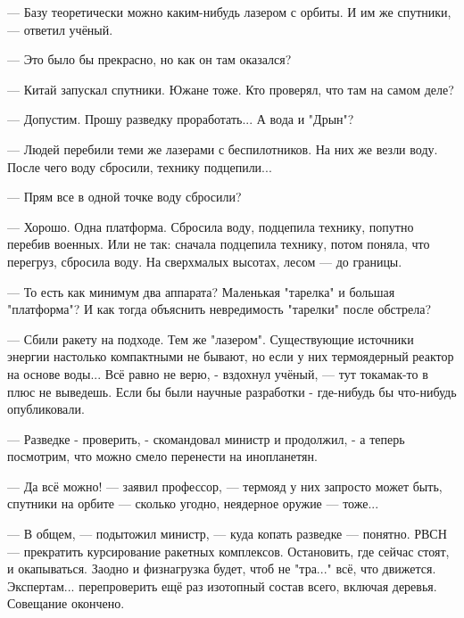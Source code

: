 --- Базу теоретически можно каким-нибудь лазером с орбиты. И им же спутники, --- ответил учёный.

--- Это было бы прекрасно, но как он там оказался?

--- Китай запускал спутники. Южане тоже. Кто проверял, что там на самом деле?

--- Допустим. Прошу разведку проработать... А вода и "Дрын"?

--- Людей перебили теми же лазерами с беспилотников. На них же везли воду. После чего воду сбросили, технику подцепили...

--- Прям все в одной точке воду сбросили?

--- Хорошо. Одна платформа. Сбросила воду, подцепила технику, попутно перебив военных.
Или не так: сначала подцепила технику, потом поняла, что перегруз, сбросила воду. На сверхмалых высотах, лесом --- до границы.

--- То есть как минимум два аппарата? Маленькая "тарелка" и большая "платформа"?
И как тогда объяснить невредимость "тарелки" после обстрела?

--- Сбили ракету на подходе. Тем же "лазером". Существующие источники энергии настолько компактными не бывают,
но если у них термоядерный реактор на основе воды... Всё равно не верю, - вздохнул учёный,
--- тут токамак-то в плюс не выведешь. Если бы были научные разработки - где-нибудь бы что-нибудь опубликовали.

--- Разведке - проверить, - скомандовал министр и продолжил, - а теперь посмотрим, что можно смело перенести на инопланетян.

--- Да всё можно! --- заявил профессор, --- термояд у них запросто может быть,
спутники на орбите --- сколько угодно, неядерное оружие --- тоже...

--- В общем, --- подытожил министр, --- куда копать разведке --- понятно.
РВСН --- прекратить курсирование ракетных комплексов. Остановить, где сейчас стоят, и окапываться.
Заодно и физнагрузка будет, чтоб не "тра..." всё, что движется.
Экспертам... перепроверить ещё раз изотопный состав всего, включая деревья. Совещание окончено.
